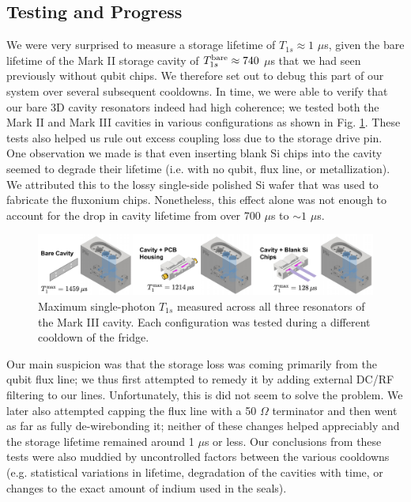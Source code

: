 \subsection{Testing and Progress}
We were very surprised to measure a storage lifetime of $T_{1s} \approx 1$ $\mu$s, given the bare lifetime of the Mark II storage cavity of $T_{1s}^{\rm bare} \approx 740$ $\mu$s that we had seen previously without qubit chips. We therefore set out to debug this part of our system over several subsequent cooldowns. In time, we were able to verify that our bare 3D cavity resonators indeed had high coherence; we tested both the Mark II and Mark III cavities in various configurations as shown in Fig. \ref{fig:4_3D_Cavity_Debugging}. These tests also helped us rule out excess coupling loss due to the storage drive pin. One observation we made is that even inserting blank Si chips into the cavity seemed to degrade their lifetime (i.e. with no qubit, flux line, or metallization). We attributed this to the lossy single-side polished Si wafer that was used to fabricate the fluxonium chips. Nonetheless, this effect alone was not enough to account for the drop in cavity lifetime from over 700 $\mu$s to $\sim\!1$ $\mu$s. 

\begin{figure}[t]
    \centering
    \includegraphics[width=\linewidth]{Figures/4/3D_Cavity_Debugging.pdf}
    \caption{Maximum single-photon $T_{1s}$ measured across all three resonators of the Mark III cavity. Each configuration was tested during a different cooldown of the fridge.}
    \label{fig:4_3D_Cavity_Debugging}
\end{figure}

Our main suspicion was that the storage loss was coming primarily from the qubit flux line; we thus first attempted to remedy it by adding external DC/RF filtering to our lines. Unfortunately, this is did not seem to solve the problem. We later also attempted capping the flux line with a 50 $\Omega$ terminator and then went as far as fully de-wirebonding it; neither of these changes helped appreciably and the storage lifetime remained around 1 $\mu$s or less. Our conclusions from these tests were also muddied by uncontrolled factors between the various cooldowns (e.g. statistical variations in lifetime, degradation of the cavities with time, or changes to the exact amount of indium used in the seals). 

